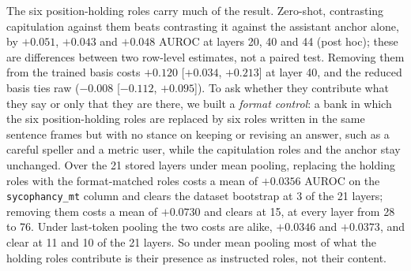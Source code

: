 The six position-holding roles carry much of the result. %
Zero-shot, contrasting capitulation against them beats contrasting it against the assistant anchor alone, by $+0.051$, $+0.043$ and $+0.048$ AUROC at layers 20, 40 and 44 (post hoc); these are differences between two row-level estimates, not a paired test. %
Removing them from the trained basis costs $+0.120$ [$+0.034$, $+0.213$] at layer 40, and the reduced basis ties raw ($-0.008$ [$-0.112$, $+0.095$]). %
To ask whether they contribute what they say or only that they are there, we built a \emph{format control}: a bank in which the six position-holding roles are replaced by six roles written in the same sentence frames but with no stance on keeping or revising an answer, such as a careful speller and a metric user, while the capitulation roles and the anchor stay unchanged. %
Over the 21 stored layers under mean pooling, replacing the holding roles with the format-matched roles costs a mean of $+0.0356$ AUROC on the \texttt{sycophancy\_mt} column and clears the dataset bootstrap at 3 of the 21 layers; removing them costs a mean of $+0.0730$ and clears at 15, at every layer from 28 to 76. %
Under last-token pooling the two costs are alike, $+0.0346$ and $+0.0373$, and clear at 11 and 10 of the 21 layers. %
So under mean pooling most of what the holding roles contribute is their presence as instructed roles, not their content. %


